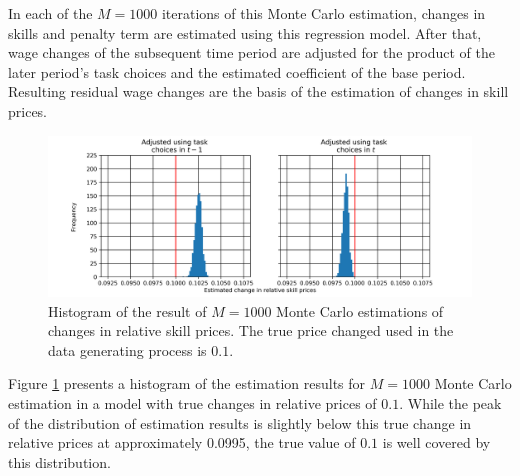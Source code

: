 \documentclass[../main.tex]{subfiles}
\begin{document}
In each of the $M=1000$ iterations of this Monte Carlo estimation, changes in skills and penalty term are estimated using this regression model. After that, wage changes of the subsequent time period are adjusted for the product of the later period's task choices and the estimated coefficient of the base period. Resulting residual wage changes are the basis of the estimation of changes in skill prices.
\\
\begin{figure}[!htbp]
	\centering
	\includegraphics[scale=0.75]{./FIG/MC_estimation_rslt.png} 
	\caption{Histogram of the result of $M=1000$ Monte Carlo estimations of changes in relative skill prices. The true price changed used in the data generating process is $0.1$.}
	\label{fig:MC_est_rslt}
\end{figure}
Figure \ref{fig:MC_est_rslt} presents a histogram of the estimation results for $M=1000$ Monte Carlo estimation in a model with true changes in relative prices of $0.1$. While the peak of the distribution of estimation results is slightly below this true change in relative prices at approximately 0.0995, the true value of $0.1$ is well covered by this distribution.
\end{document}
